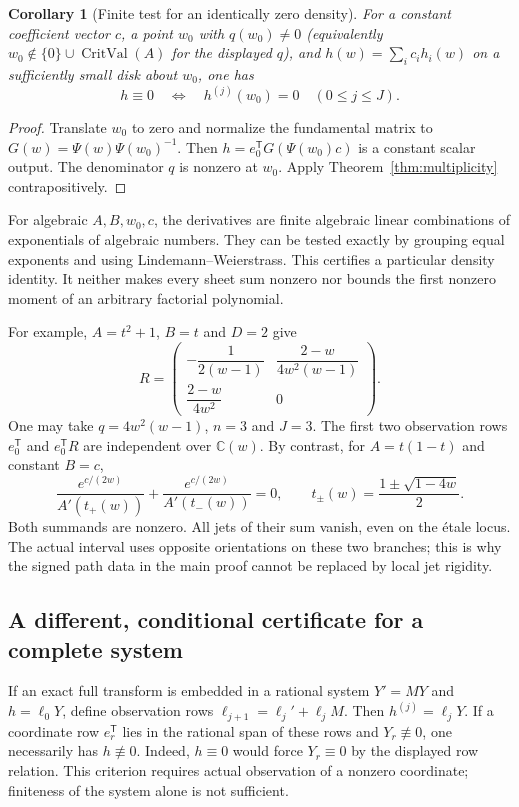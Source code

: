 \documentclass[11pt]{article}
\numberwithin{equation}{section}
\newtheorem{corollary}[theorem]{Corollary}
\theoremstyle{definition}\newtheorem{definition}[theorem]{Definition}
\theoremstyle{remark}\newtheorem{remark}[theorem]{Remark}
\newcommand{\C}{\mathbb C}
\newcommand{\Crit}{\operatorname{CritVal}}
\begin{document}
\begin{corollary}[Finite test for an identically zero density]
\label{cor:finite-jets}
For a constant coefficient vector $c$, a point $w_0$ with $q(w_0)\ne0$
(equivalently $w_0\notin\{0\}\cup\Crit(A)$ for the displayed $q$),
and $h(w)=\sum_i c_i h_i(w)$ on a sufficiently small disk about $w_0$,
one has
\[
 h\equiv0\quad\Longleftrightarrow\quad
 h^{(j)}(w_0)=0\quad(0\le j\le J).
\]
\end{corollary}
\begin{proof}
Translate $w_0$ to zero and normalize the fundamental matrix to
$G(w)=\Psi(w)\Psi(w_0)^{-1}$. Then
$h=e_0^{\mathsf T}G(\Psi(w_0)c)$ is a constant scalar output.
The denominator $q$ is nonzero at $w_0$. Apply
Theorem~\ref{thm:multiplicity} contrapositively.
\end{proof}
For algebraic $A,B,w_0,c$, the derivatives are finite algebraic linear
combinations of exponentials of algebraic numbers. They can be tested
exactly by grouping equal exponents and using Lindemann--Weierstrass.
This certifies a particular density identity. It neither makes every
sheet sum nonzero nor bounds the first nonzero moment of an arbitrary
factorial polynomial.

For example, $A=t^2+1$, $B=t$ and $D=2$ give
\[
 R=\begin{pmatrix}
 -\dfrac1{2(w-1)}&\dfrac{2-w}{4w^2(w-1)}\\[5pt]
 \dfrac{2-w}{4w^2}&0
 \end{pmatrix}.
\]
One may take $q=4w^2(w-1)$, $n=3$ and $J=3$.
The first two observation rows $e_0^{\mathsf T}$ and
$e_0^{\mathsf T}R$ are independent over $\C(w)$.
By contrast, for $A=t(1-t)$ and constant $B=c$,
\[
 \frac{e^{c/(2w)}}{A'(t_+(w))}
 +\frac{e^{c/(2w)}}{A'(t_-(w))}=0,
 \qquad t_\pm(w)=\frac{1\pm\sqrt{1-4w}}2.
\]
Both summands are nonzero. All jets of their sum vanish, even on the
\'etale locus. The actual interval uses opposite orientations on these
two branches; this is why the signed path data in the main proof
cannot be replaced by local jet rigidity.

\subsection{A different, conditional certificate for a complete system}
If an exact full transform is embedded in a rational system $Y'=MY$
and $h=\ell_0Y$, define observation rows
$\ell_{j+1}=\ell_j'+\ell_jM$. Then $h^{(j)}=\ell_jY$.
If a coordinate row $e_r^{\mathsf T}$ lies in the rational span of
these rows and $Y_r\not\equiv0$, one necessarily has $h\not\equiv0$.
Indeed, $h\equiv0$ would force $Y_r\equiv0$ by the displayed row relation.
This criterion requires actual observation of a nonzero coordinate;
finiteness of the system alone is not sufficient.
\end{document}

